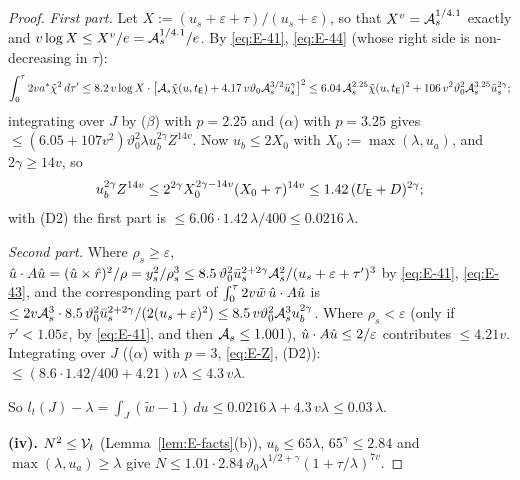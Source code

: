 \begin{proof}
\emph{First part.} Let $X:=(u_s+\varepsilon+\tau)/(u_s+\varepsilon)$, so that $X^v=\mathcal A_s^{1/4.1}$ exactly and
$v\log X\le X^v/e=\mathcal A_s^{1/4.1}/e$. By \eqref{eq:E-41}, \eqref{eq:E-44} (whose right side is non-decreasing in $\tau$):
\[
\int_0^\tau2va^*\tilde\chi^2\,d\tau'\le8.2\,v\log X\cdot\bigl[\mathcal A_s\tilde\chi(u,t_{\mathsf E})+4.17\,v\vartheta_0\mathcal A_s^{3/2}\bar u_s^\gamma\bigr]^2
\le6.04\,\mathcal A_s^{2.25}\tilde\chi(u,t_{\mathsf E})^2+106\,v^2\vartheta_0^2\mathcal A_s^{3.25}\bar u_s^{2\gamma};
\]
integrating over $J$ by ($\beta$) with $p=2.25$ and ($\alpha$) with $p=3.25$ gives
$\le(6.05+107v^2)\vartheta_0^2\lambda u_b^{2\gamma}Z^{14v}$. Now $u_b\le2X_0$ with $X_0:=\max(\lambda,u_a)$, and $2\gamma\ge14v$, so
\begin{equation}\label{eq:E-Z}
u_b^{2\gamma}Z^{14v}\le2^{2\gamma}X_0^{2\gamma-14v}(X_0+\tau)^{14v}\le1.42\,(U_{\mathsf E}+D)^{2\gamma};
\end{equation}
with (D2) the first part is $\le6.06\cdot1.42\,\lambda/400\le0.0216\,\lambda$.

\emph{Second part.} Where $\rho_s\ge\varepsilon$, $\hat u\cdot A\hat u=(\hat u\times\hat r)^2/\rho=y_s^2/\rho_s^3
\le8.5\,\vartheta_0^2\bar u_s^{2+2\gamma}\mathcal A_s^2/(u_s+\varepsilon+\tau')^3$ by \eqref{eq:E-41}, \eqref{eq:E-43}, and the
corresponding part of $\int_0^\tau2v\tilde w\,\hat u\cdot A\hat u$ is
$\le2v\mathcal A_s^3\cdot8.5\,\vartheta_0^2\bar u_s^{2+2\gamma}/(2(u_s+\varepsilon)^2)\le8.5\,v\vartheta_0^2\mathcal A_s^3u_b^{2\gamma}$. Where
$\rho_s<\varepsilon$ (only if $\tau'<1.05\varepsilon$, by \eqref{eq:E-41}, and then $\mathcal A_s\le1.001$), $\hat u\cdot A\hat u\le2/\varepsilon$
contributes $\le4.21v$. Integrating over $J$ (($\alpha$) with $p=3$, \eqref{eq:E-Z}, (D2)):
$\le(8.6\cdot1.42/400+4.21)v\lambda\le4.3\,v\lambda$.

So $l_t(J)-\lambda=\int_J(\tilde w-1)\,du\le0.0216\,\lambda+4.3\,v\lambda\le0.03\,\lambda$.

\textbf{(iv).} $N^2\le\mathcal V_t$ (Lemma~\ref{lem:E-facts}(b)), $u_b\le65\lambda$, $65^\gamma\le2.84$ and $\max(\lambda,u_a)\ge\lambda$ give
$N\le1.01\cdot2.84\,\vartheta_0\lambda^{1/2+\gamma}(1+\tau/\lambda)^{7v}$.


\end{proof}
